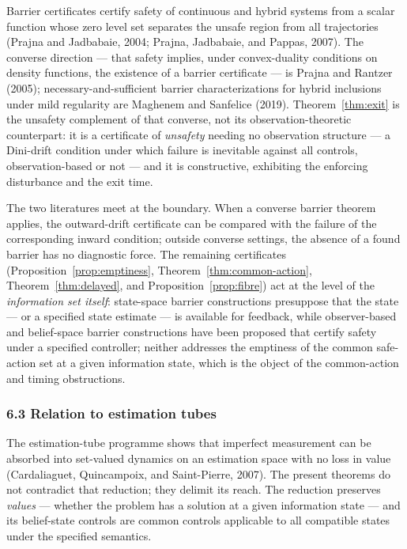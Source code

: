 \documentclass[11pt]{article}
\theoremstyle{definition}
\begin{document}
Barrier certificates certify safety of continuous and hybrid systems
from a scalar function whose zero level set separates the unsafe region
from all trajectories (Prajna and Jadbabaie, 2004; Prajna, Jadbabaie,
and Pappas, 2007). The converse direction --- that safety implies, under
convex-duality conditions on density functions, the existence of a
barrier certificate --- is Prajna and Rantzer (2005);
necessary-and-sufficient barrier characterizations for hybrid inclusions
under mild regularity are Maghenem and Sanfelice (2019). Theorem~\ref{thm:exit} is
the unsafety complement of that converse, not its observation-theoretic
counterpart: it is a certificate of \emph{unsafety} needing no
observation structure --- a Dini-drift condition under which failure is
inevitable against all controls, observation-based or not --- and it is
constructive, exhibiting the enforcing disturbance and the exit time.

The two literatures meet at the boundary. When a converse barrier
theorem applies, the outward-drift certificate can be compared with the
failure of the corresponding inward condition; outside converse
settings, the absence of a found barrier has no diagnostic force. The remaining certificates
(Proposition~\ref{prop:emptiness}, Theorem~\ref{thm:common-action}, Theorem~\ref{thm:delayed}, and Proposition~\ref{prop:fibre}) act at the level of the \emph{information set itself}:
state-space barrier constructions presuppose that the state --- or a
specified state estimate --- is available for feedback, while observer-based and belief-space barrier constructions have been proposed that certify safety under a specified controller; neither addresses the emptiness of
the common safe-action set at a given information state, which is the
object of the common-action and timing obstructions.

\subsubsection{6.3 Relation to estimation
tubes}\label{relation-to-estimation-tubes}

The estimation-tube programme shows that imperfect measurement can be
absorbed into set-valued dynamics on an estimation space with no loss in
value (Cardaliaguet, Quincampoix, and Saint-Pierre, 2007). The present
theorems do not contradict that reduction; they delimit its reach. The
reduction preserves \emph{values} --- whether the problem has a solution
at a given information state --- and its belief-state controls are common controls applicable to all compatible states under the specified semantics.
\end{document}

